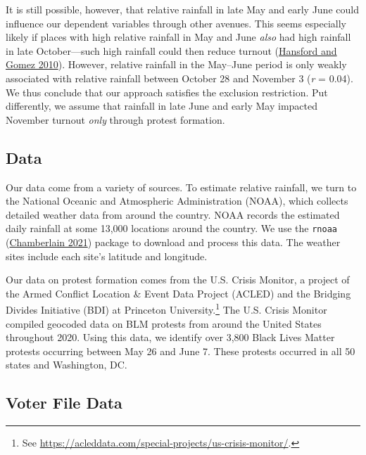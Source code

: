 \documentclass[
  12pt,
]{article}
\begin{document}
It is still possible, however, that relative rainfall in late May and early June could influence our dependent variables through other avenues. This seems especially likely if places with high relative rainfall in May and June \emph{also} had high rainfall in late October---such high rainfall could then reduce turnout (\protect\hyperlink{ref-Hansford2010}{Hansford and Gomez 2010}). However, relative rainfall in the May--June period is only weakly associated with relative rainfall between October 28 and November 3 (\emph{r} = 0.04). We thus conclude that our approach satisfies the exclusion restriction. Put differently, we assume that rainfall in late June and early May impacted November turnout \emph{only} through protest formation.

\hypertarget{data}{%
\subsection*{Data}\label{data}}

Our data come from a variety of sources. To estimate relative rainfall, we turn to the National Oceanic and Atmospheric Administration (NOAA), which collects detailed weather data from around the country. NOAA records the estimated daily rainfall at some 13,000 locations around the country. We use the \texttt{rnoaa} (\protect\hyperlink{ref-Chamberlain2021}{Chamberlain 2021}) package to download and process this data. The weather sites include each site's latitude and longitude.

Our data on protest formation comes from the U.S. Crisis Monitor, a project of the Armed Conflict Location \& Event Data Project (ACLED) and the Bridging Divides Initiative (BDI) at Princeton University.\footnote{See \url{https://acleddata.com/special-projects/us-crisis-monitor/}.} The U.S. Crisis Monitor compiled geocoded data on BLM protests from around the United States throughout 2020. Using this data, we identify over 3,800 Black Lives Matter protests occurring between May 26 and June 7. These protests occurred in all 50 states and Washington, DC.

\hypertarget{voter-file-data}{%
\subsection*{Voter File Data}\label{voter-file-data}}
\end{document}

